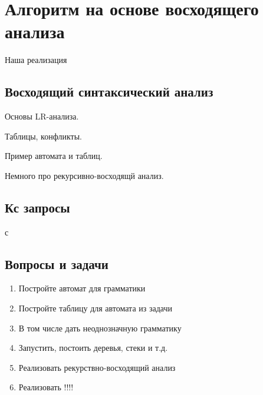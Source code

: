 \section{Алгоритм на основе восходящего анализа}

Наша реализация~\cite{10.1007/978-3-319-41579-6_22}

\subsection{Восходящий синтаксический анализ}

Основы LR-анализа.

Таблицы, конфликты.

Пример автомата и таблиц.

Немного про рекурсивно-восходящй анализ.

\subsection{Кс запросы}
с~\cite{Scott:2006:RNG:1146809.1146810}

\subsection{Вопросы и задачи}
\begin{enumerate}
\item Постройте автомат для грамматики
\item Постройте таблицу для автомата из задачи
\item В том числе дать неоднозначную грамматику
\item Запустить, постоить деревья, стеки и т.д.
\item Реализовать рекурствно-восходящий анализ
\item Реализовать !!!!
\end{enumerate}
